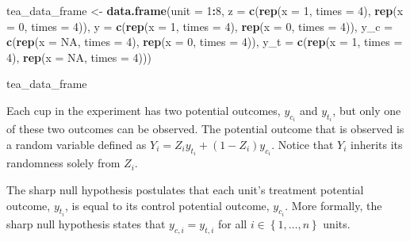 \documentclass[12pt,leqno]{article}
\newenvironment{Shaded}{\begin{snugshade}}{\end{snugshade}}
\newcommand{\DataTypeTok}[1]{\textcolor[rgb]{0.13,0.29,0.53}{#1}}
\newcommand{\DecValTok}[1]{\textcolor[rgb]{0.00,0.00,0.81}{#1}}
\newcommand{\KeywordTok}[1]{\textcolor[rgb]{0.13,0.29,0.53}{\textbf{#1}}}
\newcommand{\NormalTok}[1]{#1}
\newcommand{\OperatorTok}[1]{\textcolor[rgb]{0.81,0.36,0.00}{\textbf{#1}}}
\newcommand{\OtherTok}[1]{\textcolor[rgb]{0.56,0.35,0.01}{#1}}
\newcommand{\StringTok}[1]{\textcolor[rgb]{0.31,0.60,0.02}{#1}}
\theoremstyle{newstyle}
\begin{document}
\begin{Shaded}
\begin{Highlighting}[]
\NormalTok{tea_data_frame <-}\StringTok{ }\KeywordTok{data.frame}\NormalTok{(}\DataTypeTok{unit =} \DecValTok{1}\OperatorTok{:}\DecValTok{8}\NormalTok{,}
                             \DataTypeTok{z =} \KeywordTok{c}\NormalTok{(}\KeywordTok{rep}\NormalTok{(}\DataTypeTok{x =} \DecValTok{1}\NormalTok{, }\DataTypeTok{times =} \DecValTok{4}\NormalTok{),}
                                   \KeywordTok{rep}\NormalTok{(}\DataTypeTok{x =} \DecValTok{0}\NormalTok{, }\DataTypeTok{times =} \DecValTok{4}\NormalTok{)),}
                             \DataTypeTok{y =} \KeywordTok{c}\NormalTok{(}\KeywordTok{rep}\NormalTok{(}\DataTypeTok{x =} \DecValTok{1}\NormalTok{, }\DataTypeTok{times =} \DecValTok{4}\NormalTok{),}
                                   \KeywordTok{rep}\NormalTok{(}\DataTypeTok{x =} \DecValTok{0}\NormalTok{, }\DataTypeTok{times =} \DecValTok{4}\NormalTok{)),}
                             \DataTypeTok{y_c =} \KeywordTok{c}\NormalTok{(}\KeywordTok{rep}\NormalTok{(}\DataTypeTok{x =} \OtherTok{NA}\NormalTok{, }\DataTypeTok{times =} \DecValTok{4}\NormalTok{),}
                                     \KeywordTok{rep}\NormalTok{(}\DataTypeTok{x =} \DecValTok{0}\NormalTok{, }\DataTypeTok{times =} \DecValTok{4}\NormalTok{)),}
                             \DataTypeTok{y_t =} \KeywordTok{c}\NormalTok{(}\KeywordTok{rep}\NormalTok{(}\DataTypeTok{x =} \DecValTok{1}\NormalTok{, }\DataTypeTok{times =} \DecValTok{4}\NormalTok{),}
                                     \KeywordTok{rep}\NormalTok{(}\DataTypeTok{x =} \OtherTok{NA}\NormalTok{, }\DataTypeTok{times =} \DecValTok{4}\NormalTok{)))}

\NormalTok{tea_data_frame}
\end{Highlighting}
\end{Shaded}

Each cup in the experiment has two potential outcomes, \(y_{c_i}\) and
\(y_{t_i}\), but only one of these two outcomes can be observed. The
potential outcome that is observed is a random variable defined as
\(Y_i = Z_i y_{t_i} + \left(1 - Z_i\right)y_{c_i}\). Notice that \(Y_i\)
inherits its randomness solely from \(Z_i\).

The sharp null hypothesis postulates that each unit's treatment
potential outcome, \(y_{t_i}\), is equal to its control potential
outcome, \(y_{c_i}\). More formally, the sharp null hypothesis states
that \(y_{c,i} = y_{t,i}\) for all
\(i \in \left\{1, \ldots , n\right\}\) units.
\end{document}
